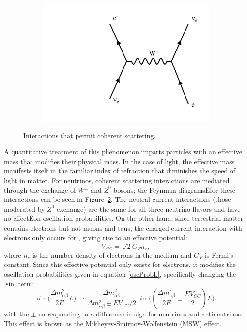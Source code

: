 \begin{figure}[t]
\begin{subfigure}[b]{0.3\textwidth}
                \includegraphics[width=\textwidth]{feynman/ccElec.pdf}
                \caption{}
                 \label{ccElec}
        \end{subfigure}
\caption{Interactions that permit coherent scattering.}
\label{cohScatter}
\end{figure}
A quantitative treatment of this phenomenon imparts particles with an effective mass that modifies their physical mass.  In the case of light, the effective mass manifests itself in the familiar index of refraction that diminishes the speed of light in matter.  For neutrinos, coherent scattering interactions are mediated through the exchange of $W^\pm$ and $Z^0$ bosons; the Feynman diagramsÊfor these interactions can be seen in Figure~\ref{cohScatter}.  The neutral current interactions (those moderated by $Z^0$ exchange) are the same for all three neutrino flavors and have no effectÊon oscillation probabilities.  On the other hand, since terrestrial matter contains electrons but not muons and taus, the charged-current interaction with electrons only occurs for \nue, giving rise to an effective potential:
\begin{equation}
\label{veff}
V_{CC} = \sqrt{2}G_F n_e,
\end{equation}
where $n_e$ is the number density of electrons in the medium and $G_F$ is Fermi's constant.  Since this effective potential only exists for electrons, it modifies the oscillation probabilities given in equation \eqref{oscProbL}, specifically changing the $\sin$ term:
\begin{equation}
\label{modSin}
\sin\bigg(\frac{\Delta m_{\alpha\beta}^2}{2E}L\bigg) \rightarrow 
\frac{\Delta m_{\alpha\beta}^2}{\Delta m_{\alpha\beta}^2 \pm E V_{CC}/2} \sin\bigg((\frac{\Delta m_{\alpha\beta}^2}{2E} \pm \frac{EV_{CC}}{2})L \bigg).
\end{equation}
with the $\pm$ corresponding to a difference in sign for neutrinos and antineutrinos.  This effect is known as the Mikheyev-Smirnov-Wolfenstein (MSW) effect.

